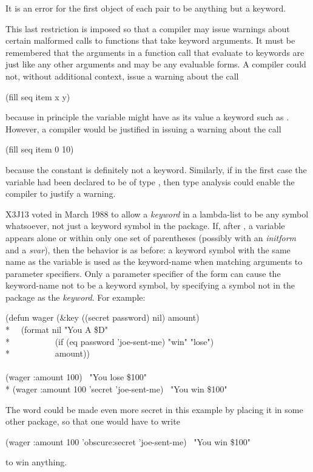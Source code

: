 \begin{obsolete}
It is an error for the first object of each pair to be
anything but a keyword.

\beforenoterule
\begin{rationale}
This last restriction is imposed so that a compiler may
issue warnings about certain malformed calls to functions
that take keyword arguments.  It must be remembered that the
arguments in a function call that evaluate to keywords are just
like any other arguments and may be any evaluable forms.
A compiler could not, without additional context, issue a warning
about the call
\begin{lisp}
(fill seq item x y)
\end{lisp}
because in principle the variable  might have as its value a keyword
such as .  However, a compiler would be justified in issuing
a warning about the call
\begin{lisp}
(fill seq item 0 10)
\end{lisp}
because the constant  is definitely not a keyword.  Similarly,
if in the first case the variable  had been declared to be
of type , then type analysis could enable the compiler
to justify a warning.
\end{rationale}
\afternoterule
\end{obsolete}

\begin{newer}
X3J13 voted in March 1988 
to allow a \emph{keyword} in a lambda-list
to be any symbol whatsoever, not just a keyword symbol
in the  package.  If, after ,
a variable appears alone or within only one set of parentheses
(possibly with an \emph{initform} and a \emph{svar}), then
the behavior is as before: a keyword symbol with the same name as
the variable is used as the keyword-name when matching arguments
to parameter specifiers.  Only a parameter specifier of the form
 can cause the keyword-name
not to be a keyword symbol, by specifying a symbol not in the 
package as the \emph{keyword}.
For example:
\begin{lisp}
(defun wager (\&key ((secret password) nil) amount) \\*
~~(format nil "You {\Xtilde}A \${\Xtilde}D" \\*
~~~~~~~~~~(if (eq password 'joe-sent-me) "win" "lose") \\*
~~~~~~~~~~amount)) \\
\\
(wager :amount 100) \EV\ "You lose \$100" \\*
(wager :amount 100 'secret 'joe-sent-me) \EV\ "You win \$100"
\end{lisp}
The  word could be made even more secret in this example
by placing it in some other  package, so that one would
have to write
\begin{lisp}
(wager :amount 100 'obscure:secret 'joe-sent-me) \EV\ "You win \$100"
\end{lisp}
to win anything.
\end{newer}

